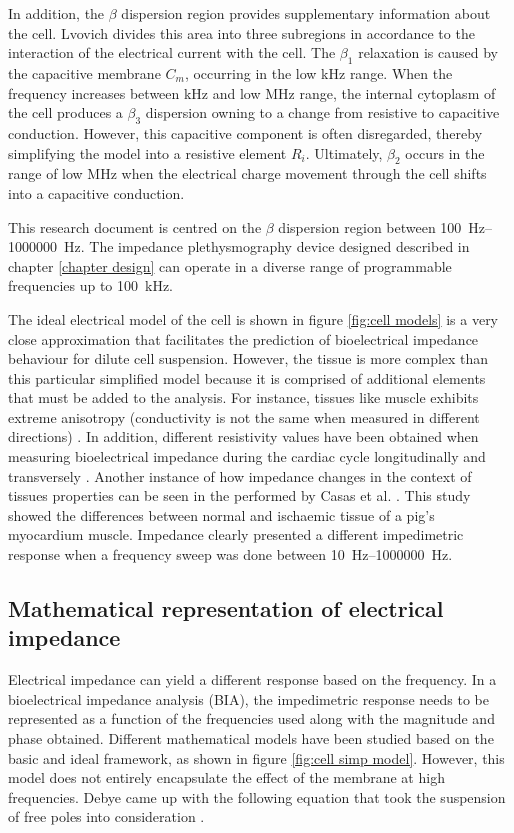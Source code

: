 In addition, the $\beta$ dispersion region provides supplementary information about the cell. Lvovich \cite{lvovich2012impedance} divides this area into three subregions in accordance to the interaction of the electrical current with the cell. The $\beta_1$ relaxation is caused by the capacitive membrane $C_m$, occurring in the low \si{\kilo\hertz} range. When the frequency increases between \si{\kilo\hertz} and low \si{\mega\hertz} range, the internal cytoplasm of the cell produces a $\beta_3$ dispersion owning to a change from resistive to capacitive conduction. However, this capacitive component is often disregarded, thereby simplifying the model into a resistive element $R_i$. Ultimately, $\beta_2$ occurs in the range of low \si{\mega\hertz} when the electrical charge movement through the cell shifts into a capacitive conduction.

This research document is centred on the $\beta$ dispersion region between \SIrange[scientific-notation = engineering]{100}{1000000}{\hertz}. The impedance plethysmography device designed described in chapter \ref{chapter design} can operate in a diverse range of programmable frequencies up to \SI{100}{\kHz}. 

The ideal electrical model of the cell is shown in figure \ref{fig:cell models} is a very close approximation that facilitates the prediction of bioelectrical impedance behaviour for dilute cell suspension. However, the tissue is more complex than this particular simplified model because it is comprised of additional elements that must be added to the analysis. For instance, tissues like muscle exhibits extreme anisotropy (conductivity is not the same when measured in different directions) \cite{lvovich2012impedance,dean2008electrical,foster1995dielectric}. In addition, different resistivity values have been obtained when measuring bioelectrical impedance during the cardiac cycle longitudinally and transversely \cite{steendijk1993four}. Another instance of how impedance changes in the context of tissues properties can be seen in the performed by Casas et al. \cite{casas1999vivo}. This study showed the differences between normal and ischaemic tissue of a pig's myocardium muscle. Impedance clearly presented a different impedimetric response when a frequency sweep was done between \SIrange[scientific-notation = engineering]{10}{1000000}{\hertz}. 

\subsection{Mathematical representation of electrical impedance}
Electrical impedance can yield a different response based on the frequency. In a bioelectrical impedance analysis (BIA), the impedimetric response needs to be represented as a function of the frequencies used along with the magnitude and phase obtained. Different mathematical models have been studied based on the basic and ideal framework, as shown in figure \ref{fig:cell simp model}. However, this model does not entirely encapsulate the effect of the membrane at high frequencies. Debye came up with the following equation that took the suspension of free poles into consideration \cite{bertemes2002tissue}.

